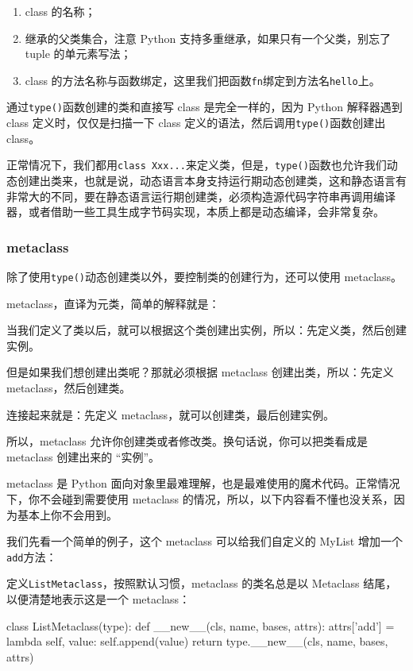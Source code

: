 \begin{enumerate}
\def\labelenumi{\arabic{enumi}.}
\item
  class 的名称；
\item
  继承的父类集合，注意 Python 支持多重继承，如果只有一个父类，别忘了
  tuple 的单元素写法；
\item
  class
  的方法名称与函数绑定，这里我们把函数\texttt{fn}绑定到方法名\texttt{hello}上。
\end{enumerate}

通过\texttt{type()}函数创建的类和直接写 class 是完全一样的，因为 Python
解释器遇到 class 定义时，仅仅是扫描一下 class
定义的语法，然后调用\texttt{type()}函数创建出 class。

正常情况下，我们都用\texttt{class\ Xxx...}来定义类，但是，\texttt{type()}函数也允许我们动态创建出类来，也就是说，动态语言本身支持运行期动态创建类，这和静态语言有非常大的不同，要在静态语言运行期创建类，必须构造源代码字符串再调用编译器，或者借助一些工具生成字节码实现，本质上都是动态编译，会非常复杂。

\hypertarget{metaclass}{%
\subsubsection{metaclass}\label{metaclass}}

除了使用\texttt{type()}动态创建类以外，要控制类的创建行为，还可以使用
metaclass。

metaclass，直译为元类，简单的解释就是：

当我们定义了类以后，就可以根据这个类创建出实例，所以：先定义类，然后创建实例。

但是如果我们想创建出类呢？那就必须根据 metaclass 创建出类，所以：先定义
metaclass，然后创建类。

连接起来就是：先定义 metaclass，就可以创建类，最后创建实例。

所以，metaclass 允许你创建类或者修改类。换句话说，你可以把类看成是
metaclass 创建出来的 ``实例''。

metaclass 是 Python
面向对象里最难理解，也是最难使用的魔术代码。正常情况下，你不会碰到需要使用
metaclass 的情况，所以，以下内容看不懂也没关系，因为基本上你不会用到。

我们先看一个简单的例子，这个 metaclass 可以给我们自定义的 MyList
增加一个\texttt{add}方法：

定义\texttt{ListMetaclass}，按照默认习惯，metaclass 的类名总是以
Metaclass 结尾，以便清楚地表示这是一个 metaclass：

\begin{pythoncode}
class ListMetaclass(type):
    def __new__(cls, name, bases, attrs):
        attrs['add'] = lambda self, value: self.append(value)
        return type.__new__(cls, name, bases, attrs)
\end{pythoncode}

